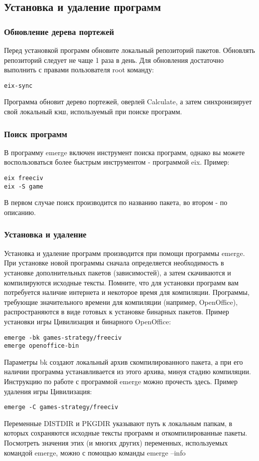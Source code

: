 \subsection{Установка и удаление программ}
\subsubsection{Обновление дерева портежей}
Перед установкой программ обновите локальный репозиторий пакетов. Обновлять репозиторий следует не чаще 1 раза в день.
Для обновления достаточно выполнить с правами пользователя root команду:
\begin{verbatim}
eix-sync
\end{verbatim}

Программа обновит дерево портежей, оверлей Calculate, а затем синхронизирует свой локальный кэш, используемый при поиске программ.

\subsubsection{Поиск программ}
В программу emerge включен инструмент поиска программ, однако вы можете воспользоваться более быстрым инструментом - программой eix.
Пример:
\begin{verbatim}
eix freeciv
eix -S game
\end{verbatim}
В первом случае поиск производится по названию пакета, во втором - по описанию.

\subsubsection{Установка и удаление}
Установка и удаление программ производится при помощи программы emerge. При установке новой программы сначала определяется необходимость в установке дополнительных пакетов (зависимостей), а затем скачиваются и компилируются исходные тексты. Помните, что для установки программ вам потребуется наличие интернета и некоторое время для компиляции. Программы, требующие значительного времени для компиляции (например, OpenOffice), распространяются в виде готовых к установке бинарных пакетов.
Пример установки игры Цивилизация и бинарного OpenOffice:
\begin{verbatim}
emerge -bk games-strategy/freeciv
emerge openoffice-bin
\end{verbatim}

Параметры bk создают локальный архив скомпилированного пакета, а при его наличии программа устанавливается из этого архива, минуя стадию компиляции. Инструкцию по работе с программой emerge можно прочесть здесь.
Пример удаления игры Цивилизация:
\begin{verbatim}
emerge -C games-strategy/freeciv
\end{verbatim}
Переменные DISTDIR и PKGDIR указывают путь к локальным папкам, в которых сохраняются исходные тексты программ и откомпилированные пакеты. Посмотреть значения этих (и многих других) переменных, используемых командой emerge, можно с помощью команды
emerge --info

